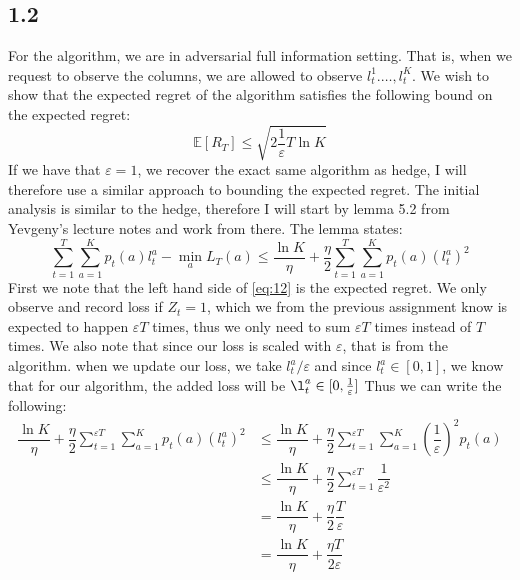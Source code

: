 \documentclass{article}
\begin{document}
\subsection{1.2}
For the algorithm, we are in adversarial full information setting. That is, when we request to observe the columns, we are allowed to observe $l_t^1 .\dots, l_t^K$. We wish to show that the expected regret of the algorithm satisfies the following bound on the expected regret:
\begin{equation}
\mathbb{E}[R_T] \leq \sqrt{2 \frac{1}{\varepsilon} T \ln K}
\end{equation}
 If we have that $\varepsilon = 1$, we recover the exact same algorithm as hedge, I will therefore use a similar approach to bounding the expected regret. The initial analysis is similar to the hedge, therefore I will start by lemma 5.2 from Yevgeny's lecture notes and work from there. 
The lemma states:
\begin{equation}
\label{eq:12}
\sum\limits_{t=1}^T\sum\limits_{a=1}^K p_t(a) l_t^a - \min_a L_T(a) \leq \dfrac{\ln K}{\eta} + \dfrac{\eta}{2} \sum\limits_{t=1}^T\sum\limits_{a=1}^K p_t(a) (l_t^a)^2
\end{equation}
First we note that the left hand side of \eqref{eq:12} is the expected regret. We only observe and record loss if $Z_t=1$, which we from the previous assignment know is expected to happen $\varepsilon T$ times, thus we only need to sum $\varepsilon T$ times instead of $T$ times.  We also note that since our loss is scaled with $\varepsilon$, that is from the algorithm. when we update our loss, we take $l_t^a / \varepsilon$ and since $l_t^a \in [0,1]$, we know that for our algorithm, the added loss will be $\l_t^a \in [0,\frac{1}{\varepsilon}]$
Thus we can write the following:
\begin{align}
\dfrac{\ln K}{\eta} + \dfrac{\eta}{2} \sum\limits_{t=1}^{\varepsilon T}\sum\limits_{a=1}^K p_t(a) (l_t^a)^2 &\leq
\dfrac{\ln K}{\eta} + \dfrac{\eta}{2} \sum\limits_{t=1}^{\varepsilon T}\sum\limits_{a=1}^K \left( \dfrac{1}{\varepsilon}\right)^2 p_t(a) \\
&\leq \dfrac{\ln K}{\eta} +  \dfrac{\eta}{2} \sum\limits_{t=1}^{\varepsilon T} \dfrac{1}{\varepsilon^2} \\
&= \dfrac{\ln K}{\eta} +  \dfrac{\eta}{2} \dfrac{T}{\varepsilon} \\
&= \dfrac{\ln K}{\eta} + \dfrac{\eta T}{2 \varepsilon}
\label{eq:her}
\end{align}
\end{document}
